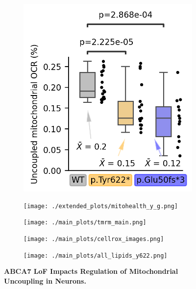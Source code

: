 \documentclass[12pt]{article}
\begin{document}
\begin{figure}[H]
\begin{subfigure}[t]{.2\textwidth}
            \includegraphics[width=\textwidth]{./main_plots/uncoupling.png}        
    \end{subfigure}   
    \begin{subfigure}[t]{.5\textwidth}
        \caption{}
        \texttt{[image: ./extended\_plots/mitohealth\_y\_g.png]}        
    \end{subfigure}    
\begin{subfigure}[t]{.35\textwidth}
        \caption{}
        \texttt{[image: ./main\_plots/tmrm\_main.png]}        \end{subfigure}    
\hspace{.25cm}
    \begin{subfigure}[t]{.35\textwidth}
        \caption{}
        \texttt{[image: ./main\_plots/cellrox\_images.png]}        
    \end{subfigure}  
    \hspace{.5cm}
    \begin{subfigure}[t]{.2\textwidth}
        \caption{}
        \texttt{[image: ./main\_plots/all\_lipids\_y622.png]}        
    \end{subfigure}  
    \caption{
        \textbf{ABCA7 LoF Impacts Regulation of Mitochondrial Uncoupling in Neurons.}\\
    }
    \label{fig:main_mitochondrial}
\end{figure}
\end{document}
